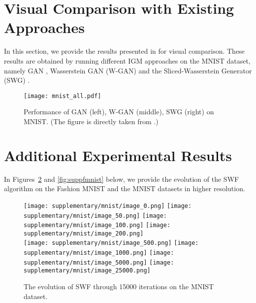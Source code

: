 

\section{Visual Comparison with Existing Approaches}

In this section, we provide the results presented in \cite{deshpande2018generative} for visual comparison. These results are obtained by running different IGM approaches on the MNIST dataset, namely GAN \cite{goodfellow2014generative}, Wasserstein GAN (W-GAN) \cite{arjovsky2017wasserstein} and the Sliced-Wasserstein Generator (SWG) \cite{deshpande2018generative}. 

\begin{figure}[h!]
\centering
\texttt{[image: mnist\_all.pdf]}
\caption{Performance of GAN (left), W-GAN (middle), SWG (right) on MNIST. (The figure is directly taken from \cite{deshpande2018generative}.) }
\label{fig:mnistall}
\end{figure}


\section{Additional Experimental Results}

In Figures~\ref{fig:suppmnist} and \ref{fig:suppfmnist} below, we provide the evolution of the SWF algorithm on the Fashion MNIST and the MNIST datasets in higher resolution.

\newcommand{\picwidth}{0.15}%

\begin{figure}
\centering
\texttt{[image: supplementary/mnist/image\_0.png]}
\texttt{[image: supplementary/mnist/image\_50.png]}
\texttt{[image: supplementary/mnist/image\_100.png]}
\texttt{[image: supplementary/mnist/image\_200.png]}\\
\texttt{[image: supplementary/mnist/image\_500.png]}
\texttt{[image: supplementary/mnist/image\_1000.png]}
\texttt{[image: supplementary/mnist/image\_5000.png]}
\texttt{[image: supplementary/mnist/image\_25000.png]}
\caption{The evolution of SWF through 15000 iterations on the MNIST dataset.}
\label{fig:suppmnist}
\end{figure}


